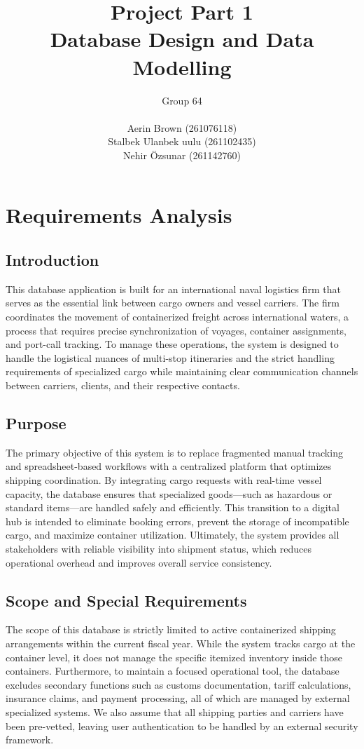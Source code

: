 \documentclass[11pt]{article}
\title{Project Part 1\\
\large Database Design and Data Modelling}
\author{Group 64\\
\\
Aerin Brown (261076118)\\
Stalbek Ulanbek uulu (261102435)\\
Nehir Özsunar (261142760)}
\date{}
\begin{document}
\maketitle

\section{Requirements Analysis}

\subsection{Introduction}

This database application is built for an international naval logistics firm that serves as the essential link between cargo owners and vessel carriers. The firm coordinates the movement of containerized freight across international waters, a process that requires precise synchronization of voyages, container assignments, and port-call tracking. To manage these operations, the system is designed to handle the logistical nuances of multi-stop itineraries and the strict handling requirements of specialized cargo while maintaining clear communication channels between carriers, clients, and their respective contacts.

\subsection{Purpose}

The primary objective of this system is to replace fragmented manual tracking and spreadsheet-based workflows with a centralized platform that optimizes shipping coordination. By integrating cargo requests with real-time vessel capacity, the database ensures that specialized goods—such as hazardous or standard items—are handled safely and efficiently. This transition to a digital hub is intended to eliminate booking errors, prevent the storage of incompatible cargo, and maximize container utilization. Ultimately, the system provides all stakeholders with reliable visibility into shipment status, which reduces operational overhead and improves overall service consistency.

\subsection{Scope and Special Requirements}

The scope of this database is strictly limited to active containerized shipping arrangements within the current fiscal year. While the system tracks cargo at the container level, it does not manage the specific itemized inventory inside those containers. Furthermore, to maintain a focused operational tool, the database excludes secondary functions such as customs documentation, tariff calculations, insurance claims, and payment processing, all of which are managed by external specialized systems. We also assume that all shipping parties and carriers have been pre-vetted, leaving user authentication to be handled by an external security framework.
\end{document}
